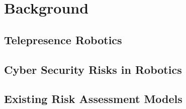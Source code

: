 
\newpage
\section{Background}


\subsection{Telepresence Robotics}


\subsection{Cyber Security Risks in Robotics}


\subsection{Existing Risk Assessment Models}

